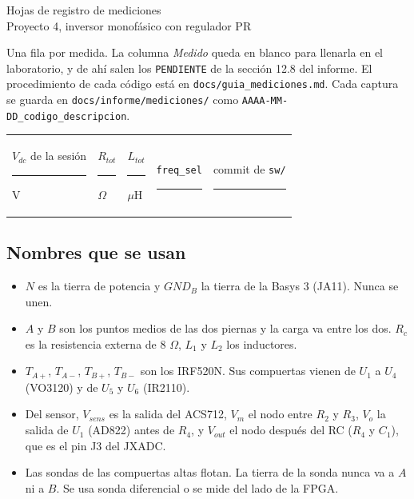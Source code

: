 \documentclass[10pt,a4paper]{article}
\newcommand{\n}[1]{\texttt{#1}}
\begin{document}
\begin{center}
{\LARGE Hojas de registro de mediciones}\\[2pt]
{\large Proyecto 4, inversor monofásico con regulador PR}
\end{center}

Una fila por medida. La columna \emph{Medido} queda en blanco para llenarla en el laboratorio, y de ahí salen los \n{PENDIENTE} de la sección 12.8 del informe. El procedimiento de cada código está en \n{docs/guia\_mediciones.md}. Cada captura se guarda en \n{docs/informe/mediciones/} como \n{AAAA-MM-DD\_codigo\_descripcion}.

\vspace{2pt}
\begin{tabular}{@{}p{4.6cm}p{4.6cm}p{4.6cm}p{4.6cm}p{4.6cm}@{}}
$V_{dc}$ de la sesión \rule{2cm}{0.3pt} V & $R_{tot}$ \rule{2cm}{0.3pt} $\Omega$ & $L_{tot}$ \rule{2cm}{0.3pt} $\mu$H & \n{freq\_sel} \rule{1.5cm}{0.3pt} & commit de \n{sw/} \rule{2.5cm}{0.3pt}
\end{tabular}

\subsection*{Nombres que se usan}
\begin{itemize}
  \item $N$ es la tierra de potencia y $GND_B$ la tierra de la Basys 3 (JA11). Nunca se unen.
  \item $A$ y $B$ son los puntos medios de las dos piernas y la carga va entre los dos. $R_c$ es la resistencia externa de 8 $\Omega$, $L_1$ y $L_2$ los inductores.
  \item $T_{A+}$, $T_{A-}$, $T_{B+}$, $T_{B-}$ son los IRF520N. Sus compuertas vienen de $U_1$ a $U_4$ (VO3120) y de $U_5$ y $U_6$ (IR2110).
  \item Del sensor, $V_{sens}$ es la salida del ACS712, $V_m$ el nodo entre $R_2$ y $R_3$, $V_o$ la salida de $U_1$ (AD822) antes de $R_4$, y $V_{out}$ el nodo después del RC ($R_4$ y $C_1$), que es el pin J3 del JXADC.
  \item Las sondas de las compuertas altas flotan. La tierra de la sonda nunca va a $A$ ni a $B$. Se usa sonda diferencial o se mide del lado de la FPGA.
\end{itemize}

\clearpage
\end{document}
